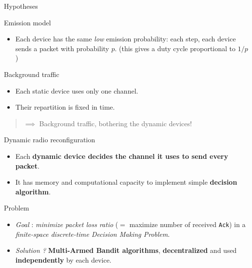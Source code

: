 \documentclass[12pt,english,ignorenonframetext,aspectratio=169,]{beamer}
\providecommand{\tightlist}{%
  \setlength{\itemsep}{0pt}\setlength{\parskip}{0pt}}
\begin{document}
\begin{frame}{Hypotheses}

\begin{block}{Emission model}

\begin{itemize}
\tightlist
\item
  Each device has the same \emph{low} emission probability: \newline
   each step, each device sends a packet with probability \(p\).
  \newline
   \hfill{}\small{(this gives a duty cycle proportional to $1/p$)}
\end{itemize}

\end{block}

\begin{block}{Background traffic}

\begin{itemize}
\tightlist
\item
  Each static device uses only one channel.
\item
  Their repartition is fixed in time.
\end{itemize}

\begin{quote}
\(\implies\) Background traffic, bothering the dynamic devices!
\end{quote}

\end{block}

\begin{block}{Dynamic radio reconfiguration}

\begin{itemize}
\tightlist
\item
  Each \textbf{dynamic device decides the channel it uses to send every
  packet}.
\item
  It has memory and computational capacity to implement simple
  \textbf{decision algorithm}.
\end{itemize}

\end{block}

\begin{block}{Problem}

\begin{itemize}
\tightlist
\item
  \emph{Goal} : \emph{minimize packet loss ratio} (\(=\) maximize number of
  received \texttt{Ack}) in a \emph{finite-space discrete-time Decision
  Making Problem}.
\item
  \emph{Solution ?} \textbf{Multi-Armed Bandit algorithms},
  \textbf{decentralized} and used \textbf{independently} by each device.
\end{itemize}

\end{block}

\end{frame}
\end{document}
